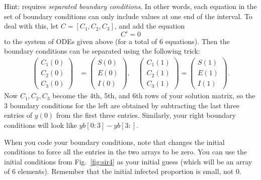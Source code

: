 \begin{problem}
Hint:  requires \emph{separated boundary conditions}.
In other words, each equation in the set of boundary conditions can only include values at one end of the interval.
To deal with this, let $C = [C_1, C_2, C_3]$, and add the equation
\[C' = 0\]
to the system of ODEs given above (for a total of 6 equations).
Then the boundary conditions can be separated using the following trick:
\begin{align*}
	\begin{pmatrix}C_1(0) \\C_2(0) \\ C_3(0) \end{pmatrix} &= \begin{pmatrix}S(0) \\E(0) \\ I(0) \end{pmatrix}, \quad 	\begin{pmatrix}C_1(1) \\C_2(1) \\ C_3(1) \end{pmatrix} = \begin{pmatrix}S(1) \\E(1) \\ I(1) \end{pmatrix}.
\end{align*}
Now $C_1,C_2,C_3$ become the 4th, 5th, and 6th rows of your solution matrix, so the 3 boundary conditions for the left are obtained by subtracting the last three entries of $y(0)$ from the first three entries. Similarly, your right boundary conditions will look like $yb[0:3]-yb[3:]$.

When you code your boundary conditions, note that  changes the initial conditions to force all the entries in the two arrays to be zero.
You can use the initial conditions from Fig.~\ref{fig:sir4} as your initial guess (which will be an array of 6 elements). Remember that the initial infected proportion is small, not 0.

\label{prob:sir_measles}
\end{problem} 